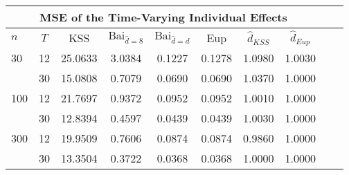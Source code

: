 \begin{tabular}{lccccccccc} 
\hline \multicolumn{8}{c}{MSE of the Time-Varying Individual Effects} \\ \hline 
$n$ & $T$ & KSS & $ \text{Bai}_{\hat{d} = 8}$ & $\text{Bai}_{\hat{d} = d}$ & Eup & $\hat{d}_{KSS}$ & $\hat{d}_{Eup}$ \\
\hline
30 & 12 &  25.0633  &  3.0384  &  0.1227  &  0.1278  &  1.0980  &  1.0030  \\
& 30 &  15.0808  &  0.7079  &  0.0690  &  0.0690  &  1.0370  &  1.0000  \\
100 & 12 &  21.7697  &  0.9372  &  0.0952  &  0.0952  &  1.0010  &  1.0000  \\
& 30 &  12.8394  &  0.4597  &  0.0439  &  0.0439  &  1.0030  &  1.0000  \\
300 & 12 &  19.9509  &  0.7606  &  0.0874  &  0.0874  &  0.9860  &  1.0000  \\
& 30 &  13.3504  &  0.3722  &  0.0368  &  0.0368  &  1.0000  &  1.0000  \\
\end{tabular} 
